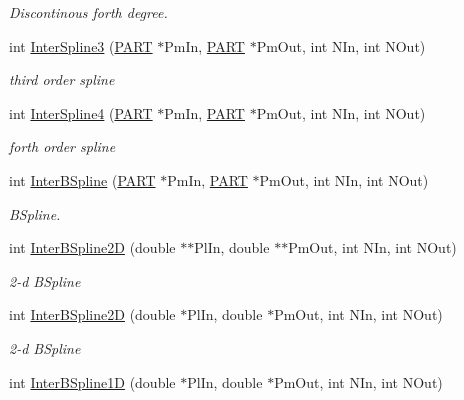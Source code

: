 \begin{DoxyCompactItemize}
\begin{DoxyCompactList}\small\item\em Discontinous forth degree. \end{DoxyCompactList}\item 
int \hyperlink{classVarData_ab0b4fada6de680561da83cca386ef45f}{Inter\+Spline3} (\hyperlink{structPART}{P\+A\+RT} $\ast$Pm\+In, \hyperlink{structPART}{P\+A\+RT} $\ast$Pm\+Out, int N\+In, int N\+Out)\hypertarget{classVarData_ab0b4fada6de680561da83cca386ef45f}{}\label{classVarData_ab0b4fada6de680561da83cca386ef45f}

\begin{DoxyCompactList}\small\item\em third order spline \end{DoxyCompactList}\item 
int \hyperlink{classVarData_aa9ed52d7528232be32a6b7c503f5783f}{Inter\+Spline4} (\hyperlink{structPART}{P\+A\+RT} $\ast$Pm\+In, \hyperlink{structPART}{P\+A\+RT} $\ast$Pm\+Out, int N\+In, int N\+Out)\hypertarget{classVarData_aa9ed52d7528232be32a6b7c503f5783f}{}\label{classVarData_aa9ed52d7528232be32a6b7c503f5783f}

\begin{DoxyCompactList}\small\item\em forth order spline \end{DoxyCompactList}\item 
int \hyperlink{classVarData_a5aa87310014b0206d554e7f3dacd73a4}{Inter\+B\+Spline} (\hyperlink{structPART}{P\+A\+RT} $\ast$Pm\+In, \hyperlink{structPART}{P\+A\+RT} $\ast$Pm\+Out, int N\+In, int N\+Out)\hypertarget{classVarData_a5aa87310014b0206d554e7f3dacd73a4}{}\label{classVarData_a5aa87310014b0206d554e7f3dacd73a4}

\begin{DoxyCompactList}\small\item\em B\+Spline. \end{DoxyCompactList}\item 
int \hyperlink{classVarData_af85ba08d7b5352f28f387d6bf36ed0b4}{Inter\+B\+Spline2D} (double $\ast$$\ast$Pl\+In, double $\ast$$\ast$Pm\+Out, int N\+In, int N\+Out)\hypertarget{classVarData_af85ba08d7b5352f28f387d6bf36ed0b4}{}\label{classVarData_af85ba08d7b5352f28f387d6bf36ed0b4}

\begin{DoxyCompactList}\small\item\em 2-\/d B\+Spline \end{DoxyCompactList}\item 
int \hyperlink{classVarData_ab633e191b0a04ba858600f241be13e0f}{Inter\+B\+Spline2D} (double $\ast$Pl\+In, double $\ast$Pm\+Out, int N\+In, int N\+Out)
\begin{DoxyCompactList}\small\item\em 2-\/d B\+Spline \end{DoxyCompactList}\item 
int \hyperlink{classVarData_aef3ce20f952bd216162301919ab01a3e}{Inter\+B\+Spline1D} (double $\ast$Pl\+In, double $\ast$Pm\+Out, int N\+In, int N\+Out)\hypertarget{classVarData_aef3ce20f952bd216162301919ab01a3e}{}\label{classVarData_aef3ce20f952bd216162301919ab01a3e}


\end{DoxyCompactItemize}
